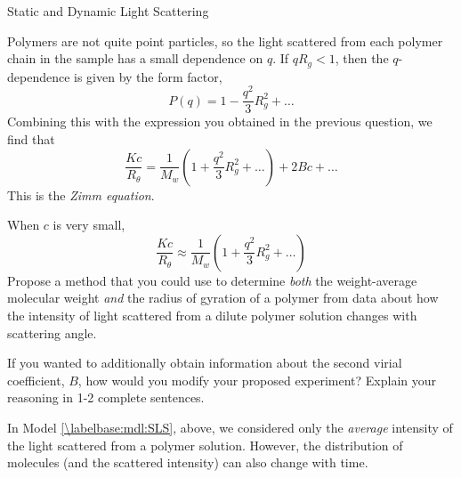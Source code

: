 \begin{activity}{Static and Dynamic Light Scattering}
\begin{ctqs}
	
\end{ctqs}

\begin{infobox}

	Polymers are not quite point particles, so the light scattered from each polymer chain in the sample has a small dependence on $q$.  If $qR_g < 1$, then the $q$-dependence is given by the form factor,
	\begin{equation*}
		P(q) = 1 - \frac{q^2}{3}R_g^2 + \dots
	\end{equation*}
	Combining this with the expression you obtained in the previous question, we find that
	\begin{equation*}
		\frac{Kc}{R_\theta} = \frac{1}{M_w}\left( 1 + \frac{q^2}{3} R_g^2 + \dots \right) + 2Bc + \dots
	\end{equation*}
	This is the \emph{Zimm equation}.
\end{infobox}

\begin{ctqs}
	
	\question When $c$ is very small,
		\begin{equation*}
			\frac{Kc}{R_\theta} \approx \frac{1}{M_w}\left(1 + \frac{q^2}{3}R_g^2 + \dots\right)
		\end{equation*}
		Propose a method that you could use to determine \emph{both} the weight-average molecular weight \emph{and} the radius of gyration of a polymer from data about how the intensity of light scattered from a dilute polymer solution changes with scattering angle.
		
		\begin{solution}[2.5in]{}
		\end{solution}
		
	\question If you wanted to additionally obtain information about the second virial coefficient, $B$, how would you modify your proposed experiment?  Explain your reasoning in 1-2 complete sentences.
		
		\begin{solution}[1.5in]{}
		\end{solution}
		
\end{ctqs}


\begin{model}
	\label{\labelbase:mdl:DLS}
	
	In Model \ref{\labelbase:mdl:SLS}, above, we considered only the \emph{average} intensity of the light scattered from a polymer solution.   However, the distribution of molecules (and the scattered intensity) can also change with time.
	

\end{model}
\end{activity}
